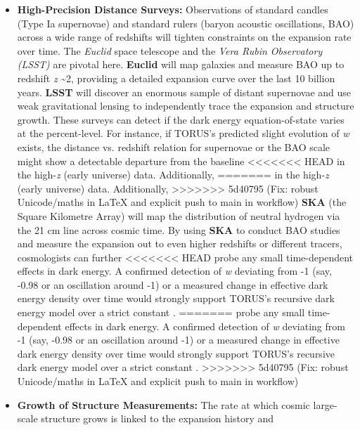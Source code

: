 \documentclass[]{article}
\begin{document}
\begin{itemize}
\item
  \textbf{High-Precision Distance Surveys:} Observations of standard
  candles (Type Ia supernovae) and standard rulers (baryon acoustic
  oscillations, BAO) across a wide range of redshifts will tighten
  constraints on the expansion rate over time. The \emph{Euclid} space
  telescope and the \emph{Vera Rubin Observatory (LSST)} are pivotal
  here. \textbf{Euclid} will map galaxies and measure BAO up to redshift
  \emph{z} \textasciitilde{}2, providing a detailed expansion curve over
  the last 10 billion years. \textbf{LSST} will discover an enormous
  sample of distant supernovae and use weak gravitational lensing to
  independently trace the expansion and structure growth. These surveys
  can detect if the dark energy equation-of-state varies at the
  percent-level. For instance, if TORUS's predicted slight evolution of
  \emph{w} exists, the distance vs. redshift relation for supernovae or
  the BAO scale might show a detectable departure from the \LambdaCDM baseline
<<<<<<< HEAD
  in the high-\emph{z} (early universe) data\hspace{0pt}. Additionally,
=======
  in the high-\emph{z} (early universe) data​. Additionally,
>>>>>>> 5d40795 (Fix: robust Unicode/maths in LaTeX and explicit push to main in workflow)
  \textbf{SKA} (the Square Kilometre Array) will map the distribution of
  neutral hydrogen via the 21 cm line across cosmic time. By using
  \textbf{SKA} to conduct BAO studies and measure the expansion out to
  even higher redshifts or different tracers, cosmologists can further
<<<<<<< HEAD
  probe any small time-dependent effects in dark energy\hspace{0pt}. A
  confirmed detection of \emph{w} deviating from -1 (say, -0.98 or an
  oscillation around -1) or a measured change in effective dark energy
  density over time would strongly support TORUS's recursive dark energy
  model over a strict constant \Lambda.
=======
  probe any small time-dependent effects in dark energy​. A confirmed
  detection of \emph{w} deviating from -1 (say, -0.98 or an oscillation
  around -1) or a measured change in effective dark energy density over
  time would strongly support TORUS's recursive dark energy model over a
  strict constant \Lambda.
>>>>>>> 5d40795 (Fix: robust Unicode/maths in LaTeX and explicit push to main in workflow)
\item
  \textbf{Growth of Structure Measurements:} The rate at which cosmic
  large-scale structure grows is linked to the expansion history and

\end{itemize}
\end{document}
